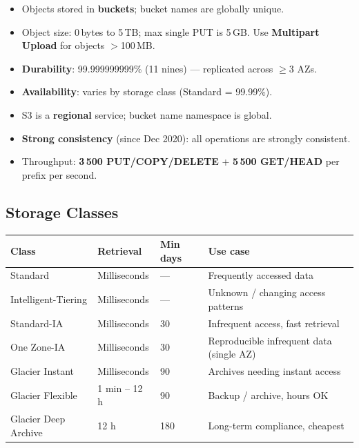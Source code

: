 

\begin{keyfacts}
\begin{itemize}
  \item Objects stored in \textbf{buckets}; bucket names are globally unique.
  \item Object size: 0\,bytes to 5\,TB; max single PUT is 5\,GB.
        Use \textbf{Multipart Upload} for objects $>$100\,MB.
  \item \textbf{Durability}: 99.999999999\% (11 nines) --- replicated across $\geq$3 AZs.
  \item \textbf{Availability}: varies by storage class (Standard = 99.99\%).
  \item S3 is a \textbf{regional} service; bucket name namespace is global.
  \item \textbf{Strong consistency} (since Dec 2020): all operations are strongly consistent.
  \item Throughput: \textbf{3\,500 PUT/COPY/DELETE} + \textbf{5\,500 GET/HEAD} per prefix per second.
\end{itemize}
\end{keyfacts}

\subsection{Storage Classes}

\begin{comparebox}[title={S3 storage class quick reference}]
\begin{tabular}{@{}p{3.2cm}p{2cm}p{1.5cm}p{4cm}@{}}
\toprule
\textbf{Class} & \textbf{Retrieval} & \textbf{Min days} & \textbf{Use case} \\
\midrule
Standard               & Milliseconds & ---  & Frequently accessed data \\
Intelligent-Tiering    & Milliseconds & ---  & Unknown / changing access patterns \\
Standard-IA            & Milliseconds & 30   & Infrequent access, fast retrieval \\
One Zone-IA            & Milliseconds & 30   & Reproducible infrequent data (single AZ) \\
Glacier Instant        & Milliseconds & 90   & Archives needing instant access \\
Glacier Flexible       & 1 min -- 12 h & 90  & Backup / archive, hours OK \\
Glacier Deep Archive   & 12 h         & 180  & Long-term compliance, cheapest \\
\bottomrule
\end{tabular}
\end{comparebox}

